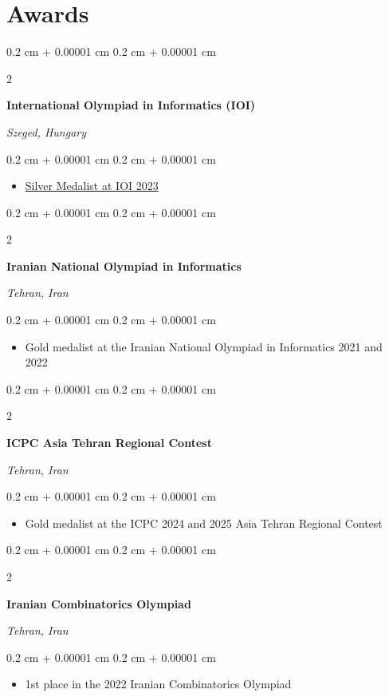 \documentclass[9pt, letterpaper]{extarticle}
\newenvironment{highlights}{
    \begin{itemize}[
        topsep=0.03 cm,
        parsep=0.03 cm,
        partopsep=0pt,
        itemsep=0pt,
        leftmargin=0.4 cm + 10pt
    ]
}{
    \end{itemize}
} %
\newenvironment{onecolentry}{
    \begin{adjustwidth}{
        0.2 cm + 0.00001 cm
    }{
        0.2 cm + 0.00001 cm
    }
}{
    \end{adjustwidth}
} %
\newenvironment{twocolentry}[2][]{
    \onecolentry
    \def\secondColumn{#2}
    \setcolumnwidth{\fill, 4.5 cm}
    \begin{paracol}{2}
}{
    \switchcolumn \raggedleft \secondColumn
    \end{paracol}
    \endonecolentry
} %
\let\hrefWithoutArrow\href
\renewcommand{\href}[2]{\hrefWithoutArrow{#1}{\ifthenelse{\equal{#2}{}}{ }{#2 }\raisebox{.15ex}{\footnotesize \faExternalLink*}}}
\begin{document}
    \section{Awards}
        \begin{twocolentry}{
        \textit{Szeged, Hungary}    
        }
            \textbf{International Olympiad in Informatics (IOI)}
        \end{twocolentry}
        \vspace{0.10 cm}
        \begin{onecolentry}
            \begin{highlights}
                \item \hrefWithoutArrow{https://stats.ioinformatics.org/people/8066}{Silver Medalist at IOI 2023}
        \end{highlights}
        \end{onecolentry}
        \vspace{0.15 cm}
        \begin{twocolentry}{
        \textit{Tehran, Iran}    
            }
            \textbf{Iranian National Olympiad in Informatics}
        \end{twocolentry}
        \vspace{0.10 cm}
        \begin{onecolentry}
            \begin{highlights}
                \item Gold medalist at the Iranian National Olympiad in Informatics 2021 and 2022
            \end{highlights}
        \end{onecolentry}
        \vspace{0.15 cm}
        \begin{twocolentry}{
            \textit{Tehran, Iran}    
                }
                \textbf{ICPC Asia Tehran Regional Contest}
            \end{twocolentry}
            \vspace{0.10 cm}
            \begin{onecolentry}
                \begin{highlights}
                    \item Gold medalist at the ICPC 2024 and 2025 Asia Tehran Regional Contest
                \end{highlights}
            \end{onecolentry}
        \vspace{0.15 cm}
        \begin{twocolentry}{
                \textit{Tehran, Iran}    
                    }
                    \textbf{Iranian Combinatorics Olympiad}
                \end{twocolentry}
                \vspace{0.10 cm}
                \begin{onecolentry}
                    \begin{highlights}
                        \item 1st place in the 2022 Iranian Combinatorics Olympiad
                    \end{highlights}
                \end{onecolentry}
\end{document}
